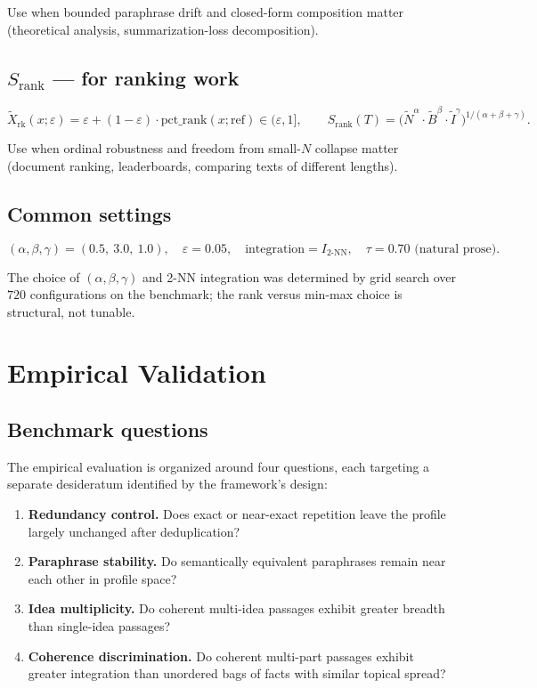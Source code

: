 \documentclass[11pt]{article}
\begin{document}
Use when bounded paraphrase drift and closed-form composition matter (theoretical analysis, summarization-loss decomposition).

\subsection{$S_{\mathrm{rank}}$ --- for ranking work}

\[
\tilde{X}_{\mathrm{rk}}(x; \varepsilon) = \varepsilon + (1 - \varepsilon) \cdot \mathrm{pct\_rank}(x; \mathrm{ref}) \in (\varepsilon, 1],
\qquad
S_{\mathrm{rank}}(T) = \bigl(\tilde{N}^\alpha \cdot \tilde{B}^\beta \cdot \tilde{I}^\gamma\bigr)^{1/(\alpha+\beta+\gamma)}.
\]

Use when ordinal robustness and freedom from small-$N$ collapse matter (document ranking, leaderboards, comparing texts of different lengths).

\subsection{Common settings}
\[
(\alpha, \beta, \gamma) = (0.5,\ 3.0,\ 1.0), \quad \varepsilon = 0.05,
\quad \text{integration} = I_{2\text{-NN}}, \quad \tau = 0.70 \text{ (natural prose)}.
\]

The choice of $(\alpha, \beta, \gamma)$ and 2-NN integration was determined by grid search over $720$ configurations on the benchmark; the rank versus min-max choice is structural, not tunable.

\section{Empirical Validation}\label{sec:validation}

\subsection{Benchmark questions}

The empirical evaluation is organized around four questions, each targeting a separate desideratum identified by the framework's design:

\begin{enumerate}
\item \textbf{Redundancy control.} Does exact or near-exact repetition leave the profile largely unchanged after deduplication?
\item \textbf{Paraphrase stability.} Do semantically equivalent paraphrases remain near each other in profile space?
\item \textbf{Idea multiplicity.} Do coherent multi-idea passages exhibit greater breadth than single-idea passages?
\item \textbf{Coherence discrimination.} Do coherent multi-part passages exhibit greater integration than unordered bags of facts with similar topical spread?
\end{enumerate}
\end{document}
